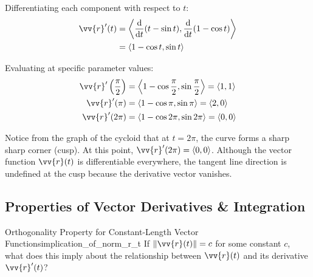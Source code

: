 \begin{sol}
Differentiating each component with respect to $t$:
\begin{align*}
\vv{r}'(t) &= \ang{\frac{\dd{}}{\dd{t}}(t - \sin t), \frac{\dd{}}{\dd{t}}(1 - \cos t)} \\
&= \ang{1 - \cos t, \sin t}
\end{align*}

Evaluating at specific parameter values:
\begin{align*}
\vv{r}'\left(\frac{\pi}{2}\right) &= \ang{1 - \cos \frac{\pi}{2}, \sin \frac{\pi}{2}} = \ang{1, 1} \\
\vv{r}'(\pi) &= \ang{1 - \cos \pi, \sin \pi} = \ang{2, 0} \\
\vv{r}'(2\pi) &= \ang{1 - \cos 2\pi, \sin 2\pi} = \ang{0, 0}
\end{align*}
\end{sol}

\begin{center}
\end{center}

Notice from the graph of the cycloid that at $t = 2\pi$, the curve forms a sharp sharp corner (cusp). At this point, $\vv{r}'(2\pi) = \ang{0, 0}$. Although the vector function $\vv{r}(t)$ is differentiable everywhere, the tangent line direction is undefined at the cusp because the derivative vector vanishes.

\subsection{Properties of Vector Derivatives \& Integration}

\begin{problem}{Orthogonality Property for Constant-Length Vector Functions}{implication_of_norm_r_t}
If $\norm{\vv{r}(t)} = c$ for some constant $c$, what does this imply about the relationship between $\vv{r}(t)$ and its derivative $\vv{r}'(t)$?
\end{problem}

